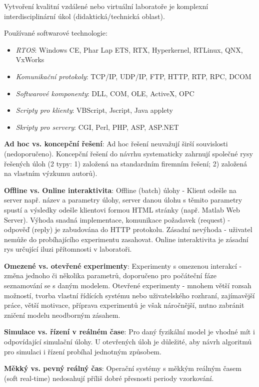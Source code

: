 Vytvoření kvalitní vzdálené nebo virtuální laboratoře je komplexní interdisciplinární úkol (didaktická/technická oblast).
\vspace{3cm}

Používané softwarové technologie:
\begin{itemize}
\item \textit{RTOS}: Windows CE, Phar Lap ETS, RTX, Hyperkernel, RTLinux, QNX, VxWorks
\item \textit{Komunikační protokoly}: TCP/IP, UDP/IP, FTP, HTTP, RTP, RPC, DCOM
\item \textit{Softwarové komponenty}: DLL, COM, OLE, ActiveX, OPC
\item \textit{Scripty pro klienty}: VBScript, Jscript, Java applety
\item \textit{Skripty pro servery}: CGI, Perl, PHP, ASP, ASP.NET
\end{itemize}

\textbf{Ad hoc vs. koncepční řešení}: Ad hoc řešení neuvažují širší souvislosti (nedoporučeno). Koncepční řešení do návrhu systematicky zahrnují společné rysy řešených úloh (2 typy: 1) založená na standardním firemním řešení; 2) založená na vlastním výzkumu autorů).

\textbf{Offline vs. Online interaktivita}: Offline (batch) úlohy - Klient odešle na server např. název a parametry úlohy, server danou úlohu s těmito parametry spustí a výsledky odešle klientovi formou HTML stránky (např. Matlab Web Server). Výhoda snadná implementace, komunikace požadavek (request) - odpověď (reply) je zabudována do HTTP protokolu. Zásadní nevýhoda - uživatel nemůže do probíhajícího experimentu zasahovat. Online interaktivita je zásadní rys určující iluzi přítomnosti v laboratoři.

\textbf{Omezené vs. otevřené experimenty}: Experimenty s omezenou interakcí  - změna jednoho či několika parametrů, doporučeno pro počáteční fáze seznamování se s daným modelem. Otevřené experimenty - mnohem větší rozsah možností, tvorba vlastní řídících systému nebo uživatelského rozhraní, zajímavější práce, větší motivace, příprava experimentů je však náročnější, nutno zabránit zničení modelu neodborným zásahem.

\textbf{Simulace vs. řízení v reálném čase}: Pro daný fyzikální model je vhodné mít i odpovídající simulační úlohy. U otevřených úloh je důležité, aby návrh algoritmů pro simulaci i řízení probíhal jednotným způsobem.

\textbf{Měkký vs. pevný reálný čas}: Operační systémy s měkkým reálným časem (soft real-time) nedosahují příliš dobré přesnosti periody vzorkování.


